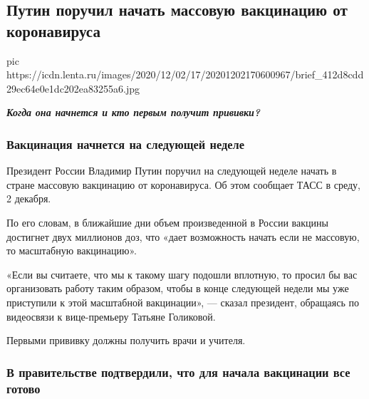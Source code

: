  
 
 
 
 
 
\subsection{Путин поручил начать массовую вакцинацию от коронавируса}
\label{sec:03_12_2020.news.ru.lenta_ru.2.putin_vaccination_start}

\ifcmt
pic https://icdn.lenta.ru/images/2020/12/02/17/20201202170600967/brief_412d8cdd29ec64e0e1dc202ea83255a6.jpg
\fi

\begin{center}
\bfseries\em\Large\color{orange}
Когда она начнется и кто первым получит прививки?
\end{center}

\subsubsection{Вакцинация начнется на следующей неделе}

Президент России Владимир Путин поручил на следующей неделе начать в стране
массовую вакцинацию от коронавируса. Об этом сообщает ТАСС в среду, 2 декабря.

По его словам, в ближайшие дни объем произведенной в России вакцины достигнет
двух миллионов доз, что «дает возможность начать если не массовую, то
масштабную вакцинацию».

«Если вы считаете, что мы к такому шагу подошли вплотную, то просил бы вас
организовать работу таким образом, чтобы в конце следующей недели мы уже
приступили к этой масштабной вакцинации», --- сказал президент, обращаясь по
видеосвязи к вице-премьеру Татьяне Голиковой.

Первыми прививку должны получить врачи и учителя.

\subsubsection{В правительстве подтвердили, что для начала вакцинации все готово}


